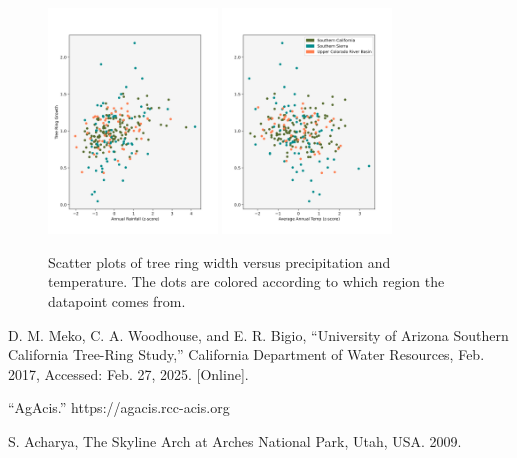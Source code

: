\documentclass[]{article}
\begin{document}
\begin{figure}
	\centering
	\includegraphics[width=0.4\textwidth]{precip_scatter.png}
	\includegraphics[width=0.4\textwidth]{temp_scatter.png}
	\caption{Scatter plots of tree ring width versus precipitation and temperature. The dots are colored according to which region the datapoint comes from.}
\end{figure} 






\begin{thebibliography}{9}
	D. M. Meko, C. A. Woodhouse, and E. R. Bigio, “University of Arizona
	Southern California Tree-Ring Study,” California Department of Water Resources, Feb. 2017, Accessed: Feb. 27, 2025. [Online].
	
	“AgAcis.” https://agacis.rcc-acis.org
	
	S. Acharya, The Skyline Arch at Arches National Park, Utah, USA. 2009.
\end{thebibliography}
\end{document}
